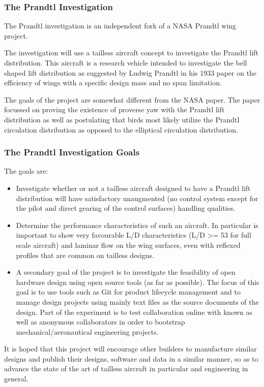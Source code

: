 \documentclass{beamer}
\begin{document}
\begin{frame}
\frametitle{The Prandtl Investigation}

The Prandtl investigation is an independent fork of a NASA Prandtl wing project.

The investigation will use a tailless aircraft concept to investigate the Prandtl lift distribution.  This aircraft is a research vehicle intended to investigate the bell shaped lift distribution as suggested by Ludwig Prandtl in his 1933 paper on the efficiency of wings with a specific design mass and no span limitation.

The goals of the project are somewhat different from the NASA paper.  The paper focussed on proving the existence of proverse yaw with the Prandtl lift distribution as well as postulating that birds most likely utilize the Prandtl circulation distribution as opposed to the elliptical circulation distribution.  

\end{frame}



\begin{frame}
\frametitle{The Prandtl Investigation Goals}

The goals are:

\begin{itemize}
\item Investigate whether or not a tailless aircraft designed to have a Prandtl lift distribution will have satisfactory unaugmented (no control system except for the pilot and direct gearing of the control surfaces) handling qualities.
\item Determine the performance characteristics of such an aircraft.  In particular is important to show very favourable L/D characteristics (L/D >= 53 for full scale aircraft) and laminar flow on the wing surfaces, even with reflexed profiles that are common on tailless designs.
\item A secondary goal of the project is to investigate the feasibility of open hardware design using open source tools (as far as possible).  The focus of this goal is to use tools such as Git for product lifecycle management and to manage design projects using mainly text files as the source documents of the design.  Part of the experiment is to test collaboration online with known as well as anonymous collaborators in order to bootstrap mechanical/aeronautical engineering projects.
\end{itemize}

It is hoped that this project will encourage other builders to manufacture similar designs and publish their designs, software and 
data in a similar manner, so as to advance the state of the art of tailless aircraft in particular and engineering in general.

\end{frame}
\end{document}
